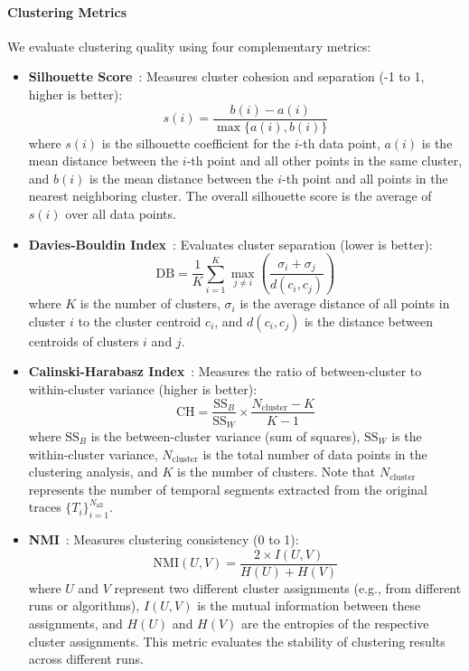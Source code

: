 \paragraph{Clustering Metrics}
\label{sec:ch4_clustering_metrics}

We evaluate clustering quality using four complementary metrics:

\begin{itemize}
\item \textbf{Silhouette Score}~\cite{rousseeuw1987silhouettes}: Measures cluster cohesion and separation (-1 to 1, higher is better):
\begin{equation}
s(i) = \frac{b(i) - a(i)}{\max\{a(i), b(i)\}}
\end{equation}
where $s(i)$ is the silhouette coefficient for the $i$-th data point, $a(i)$ is the mean distance between the $i$-th point and all other points in the same cluster, and $b(i)$ is the mean distance between the $i$-th point and all points in the nearest neighboring cluster. The overall silhouette score is the average of $s(i)$ over all data points.

\item \textbf{Davies-Bouldin Index}~\cite{davies1979cluster}: Evaluates cluster separation (lower is better):
\begin{equation}
\text{DB} = \frac{1}{K}\sum_{i=1}^{K}\max_{j \neq i}\left(\frac{\sigma_i + \sigma_j}{d(c_i, c_j)}\right)
\end{equation}
where $K$ is the number of clusters, $\sigma_i$ is the average distance of all points in cluster $i$ to the cluster centroid $c_i$, and $d(c_i, c_j)$ is the distance between centroids of clusters $i$ and $j$.

\item \textbf{Calinski-Harabasz Index}~\cite{calinski1974dendrite}: Measures the ratio of between-cluster to within-cluster variance (higher is better):
\begin{equation}
\text{CH} = \frac{\text{SS}_B}{\text{SS}_W} \times \frac{N_{\text{cluster}}-K}{K-1}
\end{equation}
where $\text{SS}_B$ is the between-cluster variance (sum of squares), $\text{SS}_W$ is the within-cluster variance, $N_{\text{cluster}}$ is the total number of data points in the clustering analysis, and $K$ is the number of clusters. Note that $N_{\text{cluster}}$ represents the number of temporal segments extracted from the original traces $\{T_i\}_{i=1}^{N_{\text{all}}}$.

\item \textbf{\ac{NMI}}~\cite{strehl2002cluster}: Measures clustering consistency (0 to 1):
\begin{equation}
\text{NMI}(U,V) = \frac{2 \times I(U,V)}{H(U) + H(V)}
\end{equation}
where $U$ and $V$ represent two different cluster assignments (e.g., from different runs or algorithms), $I(U,V)$ is the mutual information between these assignments, and $H(U)$ and $H(V)$ are the entropies of the respective cluster assignments. This metric evaluates the stability of clustering results across different runs.
\end{itemize}

